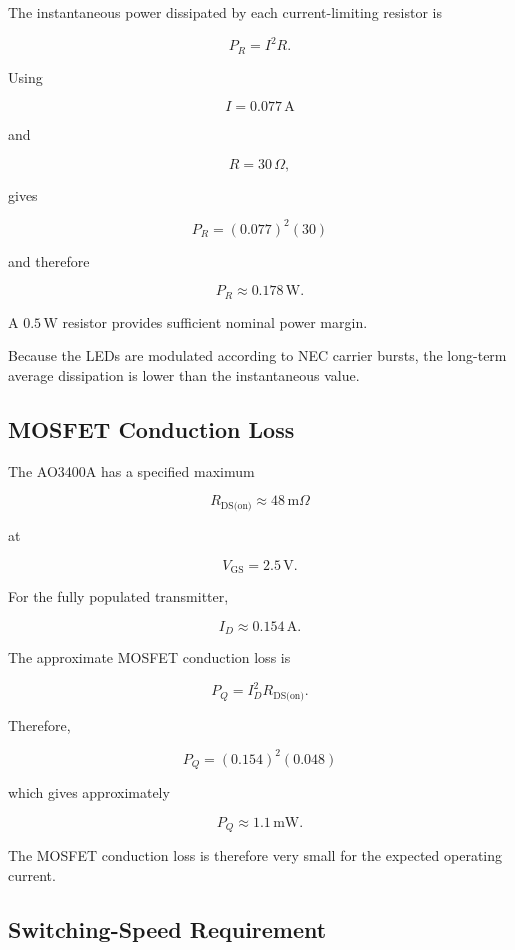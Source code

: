 \documentclass[a4paper,12pt]{article}
\begin{document}
The instantaneous power dissipated by each current-limiting resistor is

\[
P_R =
I^2R.
\]

Using

\[
I = 0.077\,\text{A}
\]

and

\[
R = 30\,\Omega,
\]

gives

\[
P_R
=
(0.077)^2(30)
\]

and therefore

\[
P_R
\approx
0.178\,\text{W}.
\]

A \(0.5\,\text{W}\) resistor provides sufficient nominal power margin.

Because the LEDs are modulated according to NEC carrier bursts, the
long-term average dissipation is lower than the instantaneous value.



\subsection{MOSFET Conduction Loss}

The AO3400A has a specified maximum

\[
R_{\text{DS(on)}}
\approx
48\,\text{m}\Omega
\]

at

\[
V_{\text{GS}} = 2.5\,\text{V}.
\]

For the fully populated transmitter,

\[
I_D \approx 0.154\,\text{A}.
\]

The approximate MOSFET conduction loss is

\[
P_Q =
I_D^2 R_{\text{DS(on)}}.
\]

Therefore,

\[
P_Q
=
(0.154)^2(0.048)
\]

which gives approximately

\[
P_Q
\approx
1.1\,\text{mW}.
\]

The MOSFET conduction loss is therefore very small for the expected
operating current.



\subsection{Switching-Speed Requirement}
\end{document}
